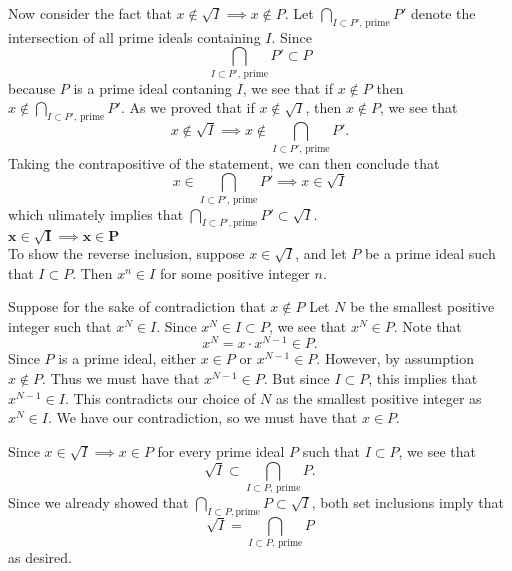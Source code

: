 \documentclass[12pt,letterpaper]{algebra_book}
\theoremstyle{definition}
\begin{document}
\begin{prf}
\begin{enumerate}
    
            Now consider the fact that $x \not\in \sqrt{I} \implies x
            \not\in P$. Let $\displaystyle \bigcap_{I \subset P' \text{, prime}}P'$
            denote the intersection of all prime ideals containing $I$. Since 
            \[
                \bigcap_{I \subset P' \text{, prime}}P' \subset P    
            \] 
            because $P$ is a prime ideal contaning $I$, we see that if $x \not\in P$ then $\displaystyle x \not\in \bigcap_{I
            \subset P' \text{, prime}}P'$. As we proved that if $x \not\in
            \sqrt{I}$, then $x \not\in P$, we see that 
            \[
                x \not\in \sqrt{I} \implies x \not\in \bigcap_{I \subset P' \text{, prime}}P'.
            \]
            Taking the contrapositive of the statement, we can then conclude
            that 
            \[
                x \in \bigcap_{I \subset P' \text{, prime}}P' \implies x \in \sqrt{I}
            \]
            which ulimately implies that $\displaystyle \bigcap_{I \subset P', \text{prime}}P'
            \subset \sqrt{I}$. 
            \\[1.2ex]
            \underline{$\bm{x \in \sqrt{I} \implies x \in P}$}\\[1.2ex]
            To show the reverse inclusion, suppose  $x \in \sqrt{I}$, and
            let $P$ be a prime ideal such that $I \subset P$. Then
            $x^n \in I$ for some positive integer $n$. 
    
            Suppose for the sake of contradiction that $x \not\in P$ Let $N$ be the
            smallest positive integer such that $x^N \in I$. 
            Since $x^N \in I \subset P$, we see that $x^N \in P$. Note
            that 
            \[
                x^N = x \cdot x^{N-1} \in P.            
            \]
            Since $P$ is a prime ideal, either $x \in P$ or $x^{N-1} \in
            P$. However, by assumption $x \not\in P$. Thus we must have
            that $x^{N-1} \in P$. But since $I \subset P$, this implies
            that $x^{N-1} \in I$. This contradicts our choice of $N$ as
            the smallest positive integer as $x^N \in I$. We have our
            contradiction, so we must have that $x \in P$. 
    
            Since $x \in \sqrt{I} \implies x \in P$  for every prime ideal
            $P$ such that $I \subset P$, we see that 
            \[
                \sqrt{I} \subset \bigcap_{I\subset P \text{, prime}} P.    
            \]
            Since we already showed that $\displaystyle \bigcap_{I\subset P, \text{
            prime}} P \subset \sqrt{I}$, both set inclusions imply  that 
            \[
                \sqrt{I} = \bigcap_{I\subset P \text{, prime}} P 
            \]
            as desired.
        \end{enumerate}
    \end{prf}
\end{document}
